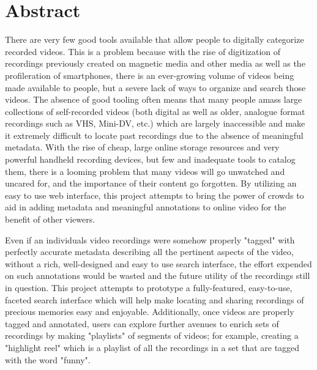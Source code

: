 %
\chapter*{Abstract}
\label{sec:abstract}
\vspace*{-10mm}





There are very few good tools available that allow people to digitally categorize recorded videos.  This is a problem because with the rise of digitization of recordings previously created on magnetic media and other media as well as the profileration of smartphones, there is an ever-growing volume of videos being made available to people, but a severe lack of ways to organize and search those videos.  The absence of good tooling often means that many people amass large collections of self-recorded videos (both digital as well as older, analogue format recordings such as VHS, Mini-DV, etc.) which are largely inaccessible and make it extremely difficult to locate past recordings due to the absence of meaningful metadata.  With the rise of cheap, large online storage resources and very powerful handheld recording devices, but few and inadequate tools to catalog them, there is a looming problem that many videos will go unwatched and uncared for, and the importance of their content go forgotten. By utilizing an easy to use web interface, this project attempts to bring the power of crowds to aid in adding metadata and meaningful annotations to online video for the benefit of other viewers. 

Even if an individuals video recordings were somehow properly "tagged" with perfectly accurate metadata describing all the pertinent aspects of the video, without a rich, well-designed and easy to use search interface, the effort expended on such annotations would be wasted and the future utility of the recordings still in question.  This project attempts to prototype a fully-featured, easy-to-use, faceted search interface which will help make locating and sharing recordings of precious memories easy and enjoyable.  Additionally, once videos are properly tagged and annotated, users can explore further avenues to enrich sets of recordings by making "playlists" of segments of videos; for example, creating a "highlight reel" which is a playlist of all the recordings in a set that are tagged with the word "funny".

